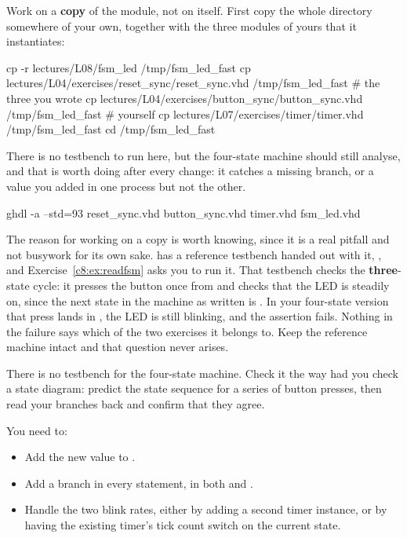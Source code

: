 Work on a \textbf{copy} of the module, not on  itself. First
copy the whole directory somewhere of your own, together with the three modules of yours that it
instantiates:

\begin{shell}
cp -r lectures/L08/fsm_led /tmp/fsm_led_fast
cp lectures/L04/exercises/reset_sync/reset_sync.vhd /tmp/fsm_led_fast     # the three you wrote
cp lectures/L04/exercises/button_sync/button_sync.vhd /tmp/fsm_led_fast   # yourself
cp lectures/L07/exercises/timer/timer.vhd /tmp/fsm_led_fast
cd /tmp/fsm_led_fast
\end{shell}

There is no testbench to run here, but the four-state machine should still analyse, and that is worth
doing after every change: it catches a missing  branch, or a  value you
added in one process but not the other.

\begin{shell}
ghdl -a --std=93 reset_sync.vhd button_sync.vhd timer.vhd fsm_led.vhd
\end{shell}

\begin{warning}
The reason for working on a copy is worth knowing, since it is a real pitfall and not busywork for
its own sake.  has a reference testbench handed out with it,
, and Exercise~\ref{c8:ex:readfsm} asks you to run it. That testbench checks
the \textbf{three}-state cycle: it presses the button once from  and checks that
the LED is steadily on, since the next state in the machine as written is . In your
four-state version that press lands in , the LED is still blinking, and the
assertion fails. Nothing in the failure says which of the two exercises it belongs to. Keep the
reference machine intact and that question never arises.
\end{warning}

There is no testbench for the four-state machine. Check it the way  had you
check a state diagram: predict the state sequence for a series of button presses, then read your
 branches back and confirm that they agree.

You need to:
\begin{itemize}
  \item Add the new value to .
  \item Add a branch in every  statement, in both  and
    .
  \item Handle the two blink rates, either by adding a second timer instance, or by having the
    existing timer's tick count switch on the current state.
\end{itemize}

